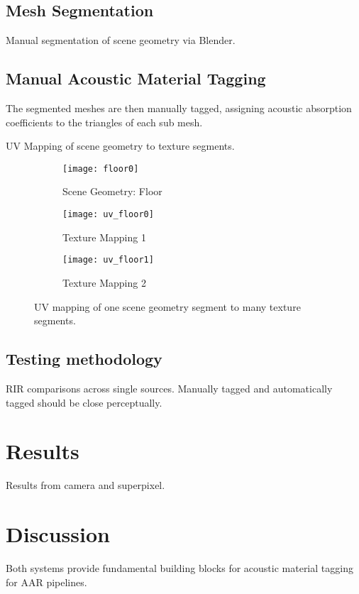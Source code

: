 \subsection{Mesh Segmentation}
Manual segmentation of scene geometry via Blender.

\subsection{Manual Acoustic Material Tagging}
The segmented meshes are then manually tagged, assigning acoustic absorption coefficients to the triangles of each sub mesh.

UV Mapping of scene geometry to texture segments.

\begin{figure}
    \centering
    \begin{subfigure}{0.75\textwidth}
        \texttt{[image: floor0]}
        \caption{Scene Geometry: Floor}
        \label{fig:floor}
    \end{subfigure}
    \hfill
    \begin{subfigure}{0.42\textwidth}
        \texttt{[image: uv\_floor0]}
        \caption{Texture Mapping 1}
        \label{fig:uv_floor}
    \end{subfigure}
    \hfill
    \begin{subfigure}{0.42\textwidth}
        \texttt{[image: uv\_floor1]}
        \caption{Texture Mapping 2}
        \label{fig:uv_floor2}
    \end{subfigure}
            
    \caption{UV mapping of one scene geometry segment to many texture segments.}
    \label{fig:uv_mapping_demo}
\end{figure}


\subsection{Testing methodology}
RIR comparisons across single sources. Manually tagged and automatically tagged should be close perceptually.


\section{Results}
Results from camera and superpixel.


\section{Discussion}
Both systems provide fundamental building blocks for acoustic material tagging for AAR pipelines.

